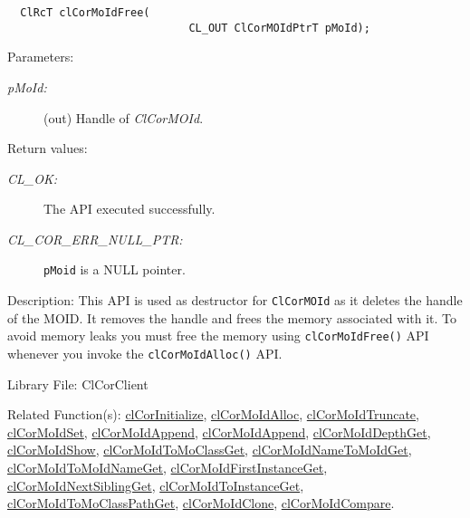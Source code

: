 \begin{flushleft}
\begin{Desc}
\footnotesize\begin{verbatim}  ClRcT clCorMoIdFree(
             				CL_OUT ClCorMOIdPtrT pMoId);
\end{verbatim}
\normalsize
\end{Desc}
\begin{Desc}
\item[Parameters:]
\begin{description}
\item[{\em p\-MoId:}](out) Handle of \textit{ClCorMOId}.\end{description}
\end{Desc}
\begin{Desc}
\item[Return values:]
\begin{description}
\item[{\em CL\_\-OK:}]The API executed successfully. 
\item[{\em CL\_\-COR\_\-ERR\_\-NULL\_\-PTR:}]{\tt{pMoid}} is a NULL pointer.\end{description}
\end{Desc}
\begin{Desc}
\item[Description:]This API is used as destructor for {\tt{ClCorMOId}} as it deletes the handle of the MOID. It removes the handle and frees 
the memory associated with it. To avoid memory leaks you must free the memory 
using {\tt{clCorMoIdFree()}} API whenever you invoke the {\tt{clCorMoIdAlloc()}} API.\end{Desc}
\begin{Desc}
\item[Library File:]Cl\-Cor\-Client\end{Desc}
\begin{Desc}
\item[Related Function(s):]\hyperlink{pagecor228}{cl\-Cor\-Initialize},
\hyperlink{pagecor113}{cl\-Cor\-MoId\-Alloc},  \hyperlink{pagecor115}{cl\-Cor\-MoId\-Truncate}, 
\hyperlink{pagecor116}{cl\-Cor\-MoId\-Set}, \hyperlink{pagecor117}{cl\-Cor\-MoId\-Append}, 
\hyperlink{pagecor117}{cl\-Cor\-MoId\-Append}, 
\hyperlink{pagecor118}{cl\-Cor\-MoId\-Depth\-Get}, 
\hyperlink{pagecor119}{cl\-Cor\-MoId\-Show}, 
\hyperlink{pagecor120}{cl\-Cor\-MoId\-To\-Mo\-Class\-Get}, 
\hyperlink{pagecor121}{cl\-Cor\-MoId\-Name\-To\-MoId\-Get}, 
\hyperlink{pagecor122}{cl\-Cor\-MoId\-To\-MoId\-Name\-Get}, 
\hyperlink{pagecor123}{cl\-Cor\-MoId\-First\-Instance\-Get},
\hyperlink{pagecor124}{cl\-Cor\-MoId\-Next\-Sibling\-Get}, 
\hyperlink{pagecor125}{cl\-Cor\-MoId\-To\-Instance\-Get}, 
\hyperlink{pagecor126}{cl\-Cor\-MoId\-To\-Mo\-Class\-Path\-Get}, 
\hyperlink{pagecor127}{cl\-Cor\-MoId\-Clone}, 
\hyperlink{pagecor128}{cl\-Cor\-MoId\-Compare}.\end{Desc}
\newpage



\end{flushleft}
